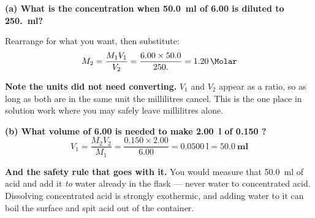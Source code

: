 \documentclass{apchem-worksheet}
\begin{document}
\begin{workedexample}
\textbf{(a) What is the concentration when \SI{50.0}{\milli\litre} of
\SI{6.00}{\Molar}  is diluted to \SI{250.}{\milli\litre}?}

Rearrange for what you want, then substitute:
\[ M_{2} = \frac{M_{1}V_{1}}{V_{2}}
         = \frac{6.00 \times 50.0}{250.}
         = \mathbf{\SI{1.20}{\Molar}} \]

\textbf{Note the units did not need converting.} $V_{1}$ and $V_{2}$
appear as a ratio, so as long as both are in the same unit the
millilitres cancel. This is the one place in solution work where you may
safely leave millilitres alone.

\textbf{(b) What volume of \SI{6.00}{\Molar}  is needed to make
\SI{2.00}{\litre} of \SI{0.150}{\Molar} ?}
\[ V_{1} = \frac{M_{2}V_{2}}{M_{1}}
         = \frac{0.150 \times 2.00}{6.00}
         = \SI{0.0500}{\litre} = \mathbf{\SI{50.0}{\milli\litre}} \]

\textbf{And the safety rule that goes with it.} You would measure that
\SI{50.0}{\milli\litre} of acid and add it \emph{to} water already in
the flask --- never water to concentrated acid. Dissolving concentrated
acid is strongly exothermic, and adding water to it can boil the surface
and spit acid out of the container.
\end{workedexample}
\end{document}

